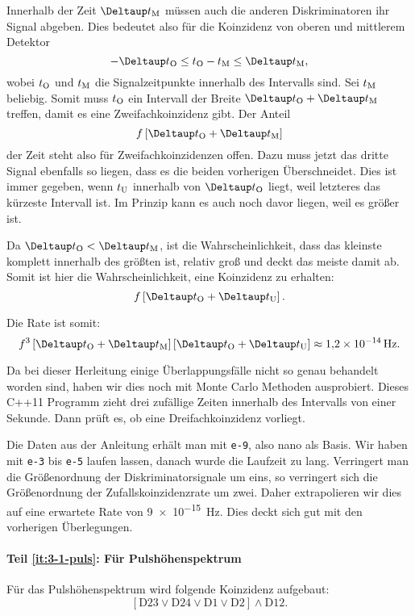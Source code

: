 \documentclass[11pt, ngerman, fleqn, DIV=15, headinclude, BCOR=2cm]{scrreprt}
\begin{document}
Innerhalb der Zeit $\DtM$ müssen auch die anderen Diskriminatoren ihr Signal
abgeben. Dies bedeutet also für die Koinzidenz von oberen und mittlerem
Detektor
\[
    - \DtO \leq t_\text O - t_\text M \leq \DtM,
\]
wobei $t_\text O$ und $t_\text M$ die Signalzeitpunkte innerhalb des Intervalls
sind. Sei $t_\text M$ beliebig. Somit muss $t_\text O$ ein Intervall der Breite
$\DtO + \DtM$ treffen, damit es eine Zweifachkoinzidenz gibt. Der Anteil
\[
    f \sbr{\DtO + \DtM}
\]
der Zeit steht also für Zweifachkoinzidenzen offen. Dazu muss jetzt das dritte
Signal ebenfalls so liegen, dass es die beiden vorherigen Überschneidet. Dies
ist immer gegeben, wenn $t_\text U$ innerhalb von $\DtO$ liegt, weil letzteres
das kürzeste Intervall ist. Im Prinzip kann es auch noch davor liegen, weil es
größer ist.

Da $\DtO < \DtM$, ist die Wahrscheinlichkeit, dass das kleinste komplett
innerhalb des größten ist, relativ groß und deckt das meiste damit ab. Somit
ist hier die Wahrscheinlichkeit, eine Koinzidenz zu erhalten:
\[
    f \sbr{\DtO + \DtU}.
\]

Die Rate ist somit:
\[
    f^3 \sbr{\DtO + \DtM} \sbr{\DtO + \DtU} \approx \SI{1.2e-14}{\hertz}.
\]

Da bei dieser Herleitung einige Überlappungsfälle nicht so genau behandelt
worden sind, haben wir dies noch mit Monte Carlo Methoden ausprobiert. Dieses
C++11 Programm zieht drei zufällige Zeiten innerhalb des Intervalls von einer
Sekunde. Dann prüft es, ob eine Dreifachkoinzidenz vorliegt.



Die Daten aus der Anleitung erhält man mit \texttt{e-9}, also nano als Basis.
Wir haben mit \texttt{e-3} bis \texttt{e-5} laufen lassen, danach wurde die
Laufzeit zu lang. Verringert man die Größenordnung der Diskriminatorsignale um
eins, so verringert sich die Größenordnung der Zufallskoinzidenzrate um zwei.
Daher extrapolieren wir dies auf eine erwartete Rate von \SI{9e-15}{\hertz}.
Dies deckt sich gut mit den vorherigen Überlegungen.

\paragraph{Teil \ref{it:3-1-puls}: Für Pulshöhenspektrum}

Für das Pulshöhenspektrum wird folgende Koinzidenz aufgebaut:
\[
    [\mathrm D23 \lor \mathrm D24 \lor \mathrm D1 \lor \mathrm D2] \land
    \mathrm D12.
\]
\end{document}
